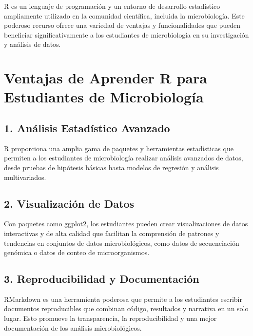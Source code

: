 \documentclass[
]{book}
\begin{document}
R es un lenguaje de programación y un entorno de desarrollo estadístico ampliamente utilizado en la comunidad científica, incluida la microbiología. Este poderoso recurso ofrece una variedad de ventajas y funcionalidades que pueden beneficiar significativamente a los estudiantes de microbiología en su investigación y análisis de datos.

\hypertarget{ventajas-de-aprender-r-para-estudiantes-de-microbiologuxeda}{%
\section{Ventajas de Aprender R para Estudiantes de Microbiología}\label{ventajas-de-aprender-r-para-estudiantes-de-microbiologuxeda}}

\hypertarget{anuxe1lisis-estaduxedstico-avanzado}{%
\subsection{1. Análisis Estadístico Avanzado}\label{anuxe1lisis-estaduxedstico-avanzado}}

R proporciona una amplia gama de paquetes y herramientas estadísticas que permiten a los estudiantes de microbiología realizar análisis avanzados de datos, desde pruebas de hipótesis básicas hasta modelos de regresión y análisis multivariados.

\hypertarget{visualizaciuxf3n-de-datos}{%
\subsection{2. Visualización de Datos}\label{visualizaciuxf3n-de-datos}}

Con paquetes como ggplot2, los estudiantes pueden crear visualizaciones de datos interactivas y de alta calidad que facilitan la comprensión de patrones y tendencias en conjuntos de datos microbiológicos, como datos de secuenciación genómica o datos de conteo de microorganismos.

\hypertarget{reproducibilidad-y-documentaciuxf3n}{%
\subsection{3. Reproducibilidad y Documentación}\label{reproducibilidad-y-documentaciuxf3n}}

RMarkdown es una herramienta poderosa que permite a los estudiantes escribir documentos reproducibles que combinan código, resultados y narrativa en un solo lugar. Esto promueve la transparencia, la reproducibilidad y una mejor documentación de los análisis microbiológicos.
\end{document}
